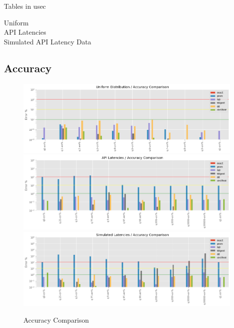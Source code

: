 \documentclass{article}
\theoremstyle{plain}
\theoremstyle{remark}
\begin{document}
{Tables in usec

Uniform\\


API Latencies\\


Simulated API Latency Data\\


\clearpage
\subsection{Accuracy}

\begin{figure}
  \includegraphics[width=\textwidth]{evaluation/images/Uniform_Distribution_accuracy.png}
  \includegraphics[width=\textwidth]{evaluation/images/API_Latencies_accuracy.png}
  \includegraphics[width=\textwidth]{evaluation/images/Simulated_Latencies_accuracy.png}
  \caption{Accuracy Comparison}
\end{figure}

}
\end{document}
